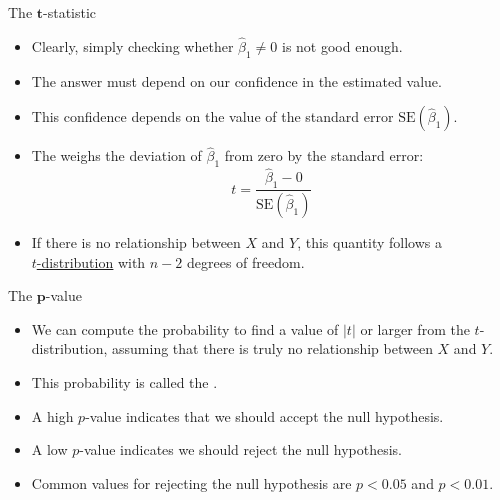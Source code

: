 \documentclass[mathserif, aspectratio=169]{beamer}
\begin{document}
\begin{frame}{The $\bm{t}$-statistic}
	\begin{itemize}
		\item Clearly, simply checking whether $\hat{\beta}_1 \ne 0$ is not good enough.
		\item The answer must depend on our confidence in the estimated value.
		\item This confidence depends on the value of the standard error $\text{SE}(\hat{\beta}_1)$.
		\item The  weighs the deviation of $\hat{\beta}_1$ from zero by the
			standard error:
			\[ t = \frac{\hat{\beta}_1 - 0}{\text{SE}(\hat{\beta}_1)} \]
		\item If there is  no relationship between $X$ and $Y$, this quantity follows a\\
			\href{https://en.wikipedia.org/wiki/Student\%27s_t-distribution}{\blue\underline{$t$-distribution}}
			with $n-2$ degrees of freedom.
	\end{itemize}
\end{frame}

\begin{frame}{The $\bm{p}$-value}
	\begin{itemize}
		\item We can compute the probability to find a value of $|t|$ or larger from the $t$-distribution,
			assuming that there is truly no relationship between $X$ and $Y$.
		\item This probability is called the .
		\item A high $p$-value indicates that we should accept the null hypothesis.
		\item A low $p$-value indicates we should reject the null hypothesis.
		\item Common values for rejecting the null hypothesis are $p < 0.05$ and $p < 0.01$.
	\end{itemize}
\end{frame}
\end{document}

